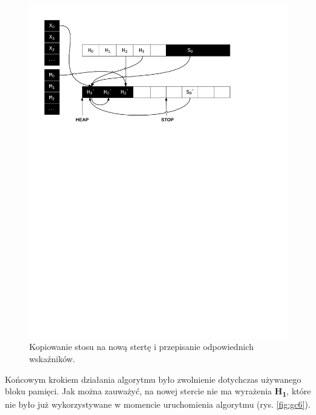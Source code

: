 \begin{figure}[h]
\centerline{\includegraphics[scale=0.75, clip, trim=10mm 180mm 45mm 10mm]{gc_5}}
\caption{Kopiowanie stosu na nową stertę i przepisanie odpowiednich wskaźników.}
\label{fig:gc5}
\end{figure}

Końcowym krokiem działania algorytmu było zwolnienie dotychczas używanego bloku pamięci. Jak można zauważyć, na nowej stercie nie ma wyrażenia \textbf{H\textsubscript{1}}, które nie było już wykorzystywane w momencie uruchomienia algorytmu (rys. \ref{fig:gc6}).

